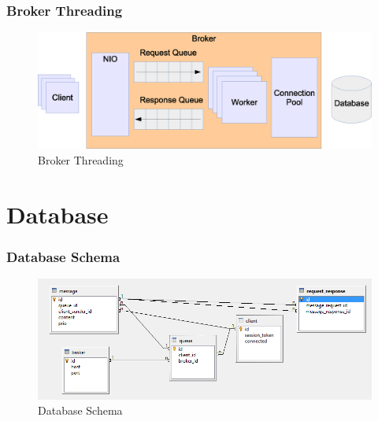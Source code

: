 \documentclass{beamer}
\begin{document}
\begin{frame}
\frametitle{Broker Threading}
\begin{figure}
  \begin{center}
    \includegraphics[scale=0.42]{../../drawings/broker-threading.eps}
  \end{center}
  \caption{Broker Threading}
  \label{fig:broker-threading}
\end{figure}


\end{frame}





\section{Database}
\begin{frame}
\frametitle{Database Schema}

\begin{figure}
  \begin{center}
    \includegraphics[scale=0.42]{../../database/db-schema.png}
  \end{center}
  \caption{Database Schema}
  \label{fig:db-schema}
\end{figure}
\end{frame}
\end{document}
